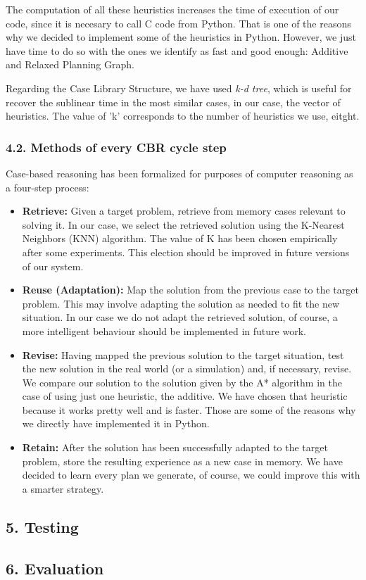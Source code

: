 \documentclass[11pt]{article}
\begin{document}
The computation of all these heuristics increases the time of execution
of our code, since it is necesary to call C code from Python. That is
one of the reasons why we decided to implement some of the heuristics in
Python. However, we just have time to do so with the ones we identify as
fast and good enough: Additive and Relaxed Planning Graph.

Regarding the Case Library Structure, we have used \emph{k-d tree},
which is useful for recover the sublinear time in the most similar
cases, in our case, the vector of heuristics. The value of 'k'
corresponds to the number of heuristics we use, eitght.

\subsubsection{4.2. Methods of every CBR cycle
step}\label{methods-of-every-cbr-cycle-step}

Case-based reasoning has been formalized for purposes of computer
reasoning as a four-step process:

\begin{itemize}
\item
  \textbf{Retrieve:} Given a target problem, retrieve from memory cases
  relevant to solving it. In our case, we select the retrieved solution
  using the K-Nearest Neighbors (KNN) algorithm. The value of K has been
  chosen empirically after some experiments. This election should be
  improved in future versions of our system.
\item
  \textbf{Reuse (Adaptation):} Map the solution from the previous case
  to the target problem. This may involve adapting the solution as
  needed to fit the new situation. In our case we do not adapt the
  retrieved solution, of course, a more intelligent behaviour should be
  implemented in future work.
\item
  \textbf{Revise:} Having mapped the previous solution to the target
  situation, test the new solution in the real world (or a simulation)
  and, if necessary, revise. We compare our solution to the solution
  given by the A* algorithm in the case of using just one heuristic, the
  additive. We have chosen that heuristic because it works pretty well
  and is faster. Those are some of the reasons why we directly have
  implemented it in Python.
\item
  \textbf{Retain:} After the solution has been successfully adapted to
  the target problem, store the resulting experience as a new case in
  memory. We have decided to learn every plan we generate, of course, we
  could improve this with a smarter strategy.
\end{itemize}

    \subsection{5. Testing}\label{testing}

    \subsection{6. Evaluation}\label{evaluation}


    
    
    
    
\end{document}
